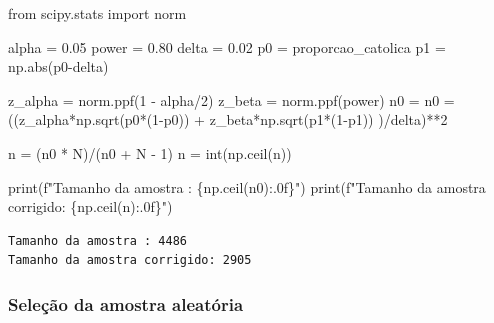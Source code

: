 \documentclass[
  letterpaper,
  DIV=11,
  numbers=noendperiod]{scrreprt}
\newenvironment{Shaded}{\begin{snugshade}}{\end{snugshade}}
\newcommand{\BuiltInTok}[1]{\textcolor[rgb]{0.00,0.23,0.31}{#1}}
\newcommand{\DecValTok}[1]{\textcolor[rgb]{0.68,0.00,0.00}{#1}}
\newcommand{\FloatTok}[1]{\textcolor[rgb]{0.68,0.00,0.00}{#1}}
\newcommand{\ImportTok}[1]{\textcolor[rgb]{0.00,0.46,0.62}{#1}}
\newcommand{\NormalTok}[1]{\textcolor[rgb]{0.00,0.23,0.31}{#1}}
\newcommand{\OperatorTok}[1]{\textcolor[rgb]{0.37,0.37,0.37}{#1}}
\newcommand{\SpecialCharTok}[1]{\textcolor[rgb]{0.37,0.37,0.37}{#1}}
\newcommand{\SpecialStringTok}[1]{\textcolor[rgb]{0.13,0.47,0.30}{#1}}
\begin{document}
\begin{Shaded}
\begin{Highlighting}[]
\ImportTok{from}\NormalTok{ scipy.stats }\ImportTok{import}\NormalTok{ norm}

\NormalTok{alpha }\OperatorTok{=} \FloatTok{0.05} 
\NormalTok{power }\OperatorTok{=} \FloatTok{0.80} 
\NormalTok{delta }\OperatorTok{=} \FloatTok{0.02}
\NormalTok{p0 }\OperatorTok{=}\NormalTok{ proporcao\_catolica}
\NormalTok{p1 }\OperatorTok{=}\NormalTok{ np.}\BuiltInTok{abs}\NormalTok{(p0}\OperatorTok{{-}}\NormalTok{delta)}


\NormalTok{z\_alpha }\OperatorTok{=}\NormalTok{ norm.ppf(}\DecValTok{1} \OperatorTok{{-}}\NormalTok{ alpha}\OperatorTok{/}\DecValTok{2}\NormalTok{) }
\NormalTok{z\_beta }\OperatorTok{=}\NormalTok{ norm.ppf(power) }
\NormalTok{n0 }\OperatorTok{=}\NormalTok{ n0 }\OperatorTok{=}\NormalTok{ ((z\_alpha}\OperatorTok{*}\NormalTok{np.sqrt(p0}\OperatorTok{*}\NormalTok{(}\DecValTok{1}\OperatorTok{{-}}\NormalTok{p0)) }\OperatorTok{+}\NormalTok{ z\_beta}\OperatorTok{*}\NormalTok{np.sqrt(p1}\OperatorTok{*}\NormalTok{(}\DecValTok{1}\OperatorTok{{-}}\NormalTok{p1)) )}\OperatorTok{/}\NormalTok{delta)}\OperatorTok{**}\DecValTok{2} 

\NormalTok{n }\OperatorTok{=}\NormalTok{ (n0 }\OperatorTok{*}\NormalTok{ N)}\OperatorTok{/}\NormalTok{(n0 }\OperatorTok{+}\NormalTok{ N }\OperatorTok{{-}} \DecValTok{1}\NormalTok{) }
\NormalTok{n }\OperatorTok{=} \BuiltInTok{int}\NormalTok{(np.ceil(n)) }

\BuiltInTok{print}\NormalTok{(}\SpecialStringTok{f"Tamanho da amostra : }\SpecialCharTok{\{}\NormalTok{np}\SpecialCharTok{.}\NormalTok{ceil(n0)}\SpecialCharTok{:.0f\}}\SpecialStringTok{"}\NormalTok{)}
\BuiltInTok{print}\NormalTok{(}\SpecialStringTok{f"Tamanho da amostra corrigido: }\SpecialCharTok{\{}\NormalTok{np}\SpecialCharTok{.}\NormalTok{ceil(n)}\SpecialCharTok{:.0f\}}\SpecialStringTok{"}\NormalTok{)}
\end{Highlighting}
\end{Shaded}

\begin{verbatim}
Tamanho da amostra : 4486
Tamanho da amostra corrigido: 2905
\end{verbatim}

\subsubsection{Seleção da amostra
aleatória}\label{seleuxe7uxe3o-da-amostra-aleatuxf3ria-2}
\end{document}
